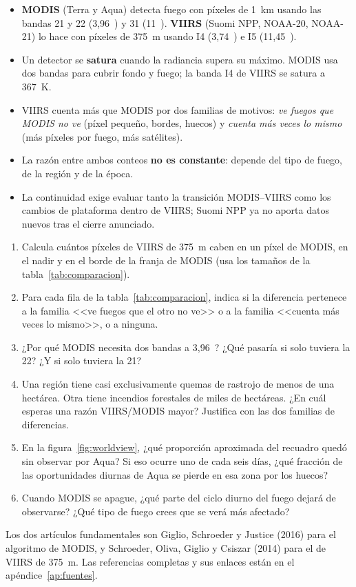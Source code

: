 \begin{itemize}
  \item \textbf{MODIS} (Terra y Aqua) detecta fuego con píxeles de 1~km usando las bandas 21 y
  22 (3,96~\um) y 31 (11~\um). \textbf{VIIRS} (Suomi NPP, NOAA-20, NOAA-21) lo hace con píxeles
  de 375~m usando I4 (3,74~\um) e I5 (11,45~\um).
  \item Un detector se \textbf{satura} cuando la radiancia supera su máximo. MODIS usa dos
  bandas para cubrir fondo y fuego; la banda I4 de VIIRS se satura a 367~K.
  \item VIIRS cuenta más que MODIS por dos familias de motivos: \emph{ve fuegos que MODIS no ve}
  (píxel pequeño, bordes, huecos) y \emph{cuenta más veces lo mismo} (más píxeles por fuego, más
  satélites).
  \item La razón entre ambos conteos \textbf{no es constante}: depende del tipo de fuego, de la
  región y de la época.
  \item La continuidad exige evaluar tanto la transición MODIS--VIIRS como los cambios
  de plataforma dentro de VIIRS; Suomi NPP ya no aporta datos nuevos tras el cierre anunciado.
\end{itemize}

\ejercicios

\begin{enumerate}
  \item Calcula cuántos píxeles de VIIRS de 375~m caben en un píxel de MODIS, en el nadir y en
  el borde de la franja de MODIS (usa los tamaños de la tabla~\ref{tab:comparacion}).
  \item Para cada fila de la tabla~\ref{tab:comparacion}, indica si la diferencia pertenece a
  la familia <<ve fuegos que el otro no ve>> o a la familia <<cuenta más veces lo mismo>>, o a
  ninguna.
  \item ¿Por qué MODIS necesita dos bandas a 3,96~\um? ¿Qué pasaría si solo tuviera la 22? ¿Y si
  solo tuviera la 21?
  \item Una región tiene casi exclusivamente quemas de rastrojo de menos de una hectárea. Otra
  tiene incendios forestales de miles de hectáreas. ¿En cuál esperas una razón VIIRS/MODIS
  mayor? Justifica con las dos familias de diferencias.
  \item En la figura~\ref{fig:worldview}, ¿qué proporción aproximada del recuadro quedó sin
  observar por Aqua? Si eso ocurre uno de cada seis días, ¿qué fracción de las oportunidades
  diurnas de Aqua se pierde en esa zona por los huecos?
  \item Cuando MODIS se apague, ¿qué parte del ciclo diurno del fuego dejará de observarse? ¿Qué
  tipo de fuego crees que se verá más afectado?
\end{enumerate}

\lecturas

Los dos artículos fundamentales son Giglio, Schroeder y Justice (2016) para el algoritmo de
MODIS, y Schroeder, Oliva, Giglio y Csiszar (2014) para el de VIIRS de 375~m. Las referencias
completas y sus enlaces están en el apéndice~\ref{ap:fuentes}.
